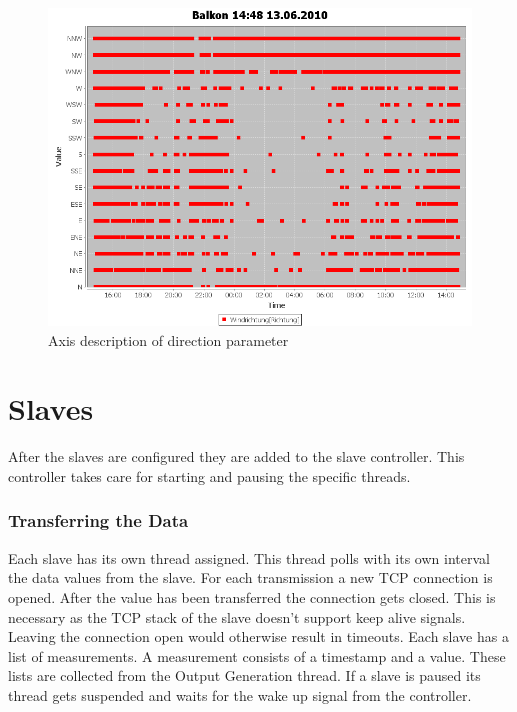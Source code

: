 \begin{figure}[ht]
    \centering
    \includegraphics[width=0.9\linewidth]{master/plot_dir.png}
    \caption{Axis description of direction parameter}
    \label{fig:dir}
\end{figure}

\section{Slaves} %
\label{sec:slaves}

After the slaves are configured they are added to the slave controller. This controller takes care for starting and pausing the specific threads. 

\subsubsection{Transferring the Data} %
\label{ssub:getting_the_data}
Each slave has its own thread assigned. This thread polls with its own interval the data values from the slave. For each transmission a new TCP connection is opened. After the value has been transferred the connection gets closed. This is necessary as the TCP stack of the slave doesn't support keep alive signals. Leaving the connection open would otherwise result in timeouts. Each slave has a list of measurements. A measurement consists of a timestamp and a value. These lists are collected from the Output Generation thread. If a slave is paused its thread gets suspended and waits for the wake up signal from the controller. 

